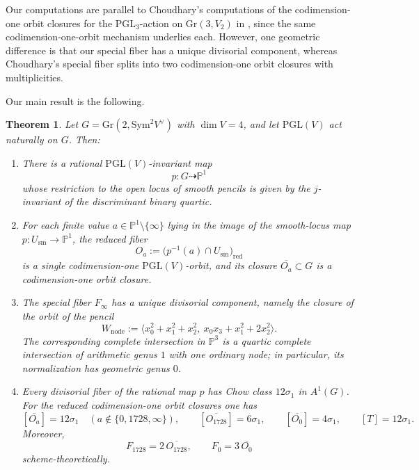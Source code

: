 \documentclass[11pt]{article}
\newtheorem{theorem}{Theorem}[section]
\newcommand{\G}{\mathrm{Gr}}
\newcommand{\Pj}{\mathbb P}
\newcommand{\Sym}{\mathrm{Sym}}
\newcommand{\PGL}{\mathrm{PGL}}
\begin{document}
Our computations are parallel to Choudhary's computations of the codimension-one orbit closures for the $\PGL_3$-action on $\G(3,V_2)$ in \cite{Choudhary}, since the same codimension-one-orbit mechanism underlies each. However, one geometric difference is that our special fiber has a unique divisorial component, whereas Choudhary's special fiber splits into two codimension-one orbit closures with multiplicities.

Our main result is the following.

\begin{theorem}\label{thm:main}
Let $G=\G(2,\Sym^2 V^\vee)$ with $\dim V=4$, and let $\PGL(V)$ act naturally on $G$. Then:
\begin{enumerate}[label=\textup{(\roman*)}]
    \item There is a rational $\PGL(V)$-invariant map
    \[
    p\colon G \dashrightarrow \Pj^1
    \]
    whose restriction to the open locus of smooth pencils is given by the $j$-invariant of the discriminant binary quartic.
    \item For each finite value $a\in \Pj^1\setminus\{\infty\}$ lying in the image of the smooth-locus map $p\colon U_{\mathrm{sm}}\to \Pj^1$, the reduced fiber
    \[
    O_a := \bigl(p^{-1}(a)\cap U_{\mathrm{sm}}\bigr)_{\mathrm{red}}
    \]
    is a single codimension-one $\PGL(V)$-orbit, and its closure $\overline{O_a}\subset G$
    is a codimension-one orbit closure.
    \item The special fiber $F_{\infty}$ has a unique divisorial component, namely the closure of the orbit of the pencil
    \[
    W_{\mathrm{node}}:=\big\langle x_0^2+x_1^2+x_2^2,\ x_0x_3+x_1^2+2x_2^2\big\rangle.
    \]
    The corresponding complete intersection in $\Pj^3$ is a quartic complete intersection of arithmetic genus $1$ with one ordinary node; in particular, its normalization has geometric genus $0$.
    \item Every divisorial fiber of the rational map $p$ has Chow class $12\sigma_1$ in
    $A^1(G)$. For the reduced codimension-one orbit closures one has
    \[
    [\overline{O_a}] = 12\sigma_1 \quad (a\notin\{0,1728,\infty\}),
    \qquad
    [\overline{O_{1728}}]=6\sigma_1,
    \qquad
    [\overline{O_0}]=4\sigma_1,
    \qquad
    [T]=12\sigma_1.
    \]
    Moreover,
    \[
    F_{1728}=2\,\overline{O_{1728}},
    \qquad
    F_0=3\,\overline{O_0}
    \]
    scheme-theoretically.
\end{enumerate}
\end{theorem}
\end{document}
